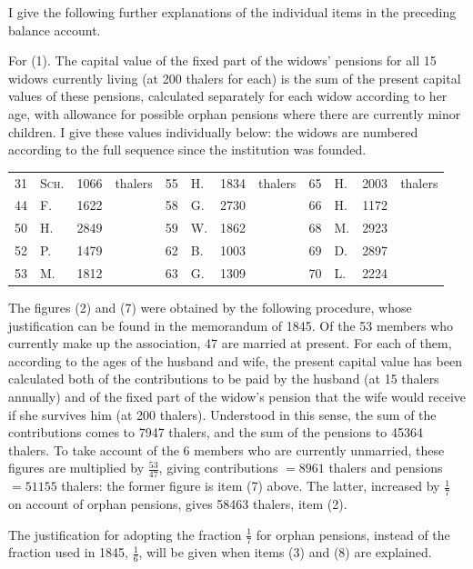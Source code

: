 \noindent\hspace*{\parindent}I give the following further explanations of the individual items in the preceding balance account.

For (1). The capital value of the fixed part of the widows' pensions for all 15 widows currently living (at 200 thalers for each) is the sum of the present capital values of these pensions, calculated separately for each widow according to her age, with allowance for possible orphan pensions where there are currently minor children. I give these values individually below: the widows are numbered according to the full sequence since the institution was founded.
\begin{center}
\footnotesize\setlength{\tabcolsep}{3pt}
\begin{tabular}{r|l|r l||r|l|r l||r|l|r l}
31&\textsc{Sch.}&1066&thalers&55&H.&1834&thalers&65&H.&2003&thalers\\
44&F.&1622&&58&G.&2730&&66&H.&1172&\\
50&H.&2849&&59&W.&1862&&68&M.&2923&\\
52&P.&1479&&62&B.&1003&&69&D.&2897&\\
53&M.&1812&&63&G.&1309&&70&L.&2224&
\end{tabular}
\end{center}
\noindent\hspace*{\parindent}The figures (2) and (7) were obtained by the following procedure, whose justification can be found in the memorandum of 1845. Of the 53 members who currently make up the association, 47 are married at present. For each of them, according to the ages of the husband and wife, the present capital value has been calculated both of the contributions to be paid by the husband (at 15 thalers annually) and of the fixed part of the widow's pension that the wife would receive if she survives him (at 200 thalers). Understood in this sense, the sum of the contributions comes to 7947 thalers, and the sum of the pensions to 45364 thalers. To take account of the 6 members who are currently unmarried, these figures are multiplied by \(\tfrac{53}{47}\), giving contributions \(=8961\) thalers and pensions \(=51155\) thalers: the former figure is item (7) above. The latter, increased by \(\tfrac{1}{7}\) on account of orphan pensions, gives 58463 thalers, item (2).

The justification for adopting the fraction \(\tfrac{1}{7}\) for orphan pensions, instead of the fraction used in 1845, \(\tfrac{1}{6}\), will be given when items (3) and (8) are explained.


